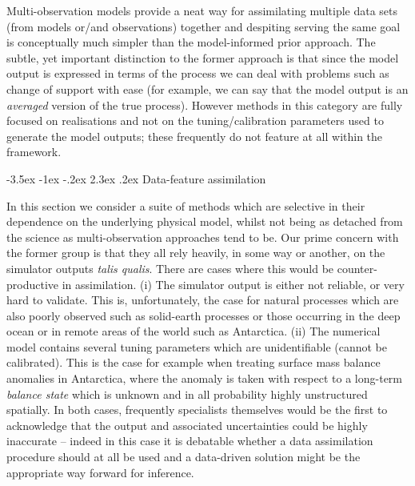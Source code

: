\documentclass[10pt,a4paper]{article}
\makeatletter
\renewcommand\section{\@startsection{section}{1}{\z@}%
                                  {-3.5ex \@plus -1ex \@minus -.2ex}%
                                  {2.3ex \@plus.2ex}%
                                  {\normalfont\large\bfseries}}
\makeatother
\begin{document}
Multi-observation models provide a neat way for assimilating multiple data sets (from models or/and observations) together and despiting serving the same goal is conceptually much simpler than the model-informed prior approach. The subtle, yet important distinction to the former approach is that since the model output is expressed in terms of the process we can deal with problems such as change of support with ease (for example, we can say that the model output is an \emph{averaged} version of the true process). However methods in this category are fully focused on realisations and not on the tuning/calibration parameters used to generate the model outputs; these frequently do not feature at all within the framework.  



\section{Data-feature assimilation}

In this section we consider a suite of methods which are selective in their dependence on the underlying physical model, whilst not being as detached from the science as multi-observation approaches tend to be. Our prime concern with the former group is that they all rely heavily, in some way or another, on the simulator outputs \emph{talis qualis}. There are cases where this would be counter-productive in assimilation. (i) The simulator output is either not reliable, or very hard to validate. This is, unfortunately, the case for natural processes which are also poorly observed such as solid-earth processes or those occurring in the deep ocean or in remote areas of the world such as Antarctica. (ii) The numerical model contains several tuning parameters which are unidentifiable (cannot be calibrated). This is the case for example when treating surface mass balance anomalies in Antarctica, where the anomaly is taken with respect to a long-term \emph{balance state} which is unknown and in all probability highly unstructured spatially. In both cases, frequently specialists themselves would be the first to acknowledge that the output and associated uncertainties could be highly inaccurate -- indeed in this case it is debatable whether a data assimilation procedure should at all be used and a data-driven solution might be the appropriate way forward for inference. 
\end{document}
